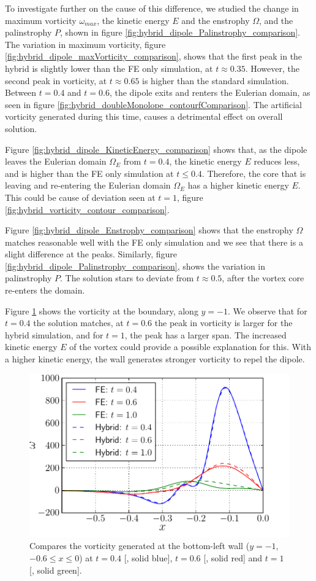 To investigate further on the cause of this difference, we studied the change in maximum vorticity $\omega_{max}$, the kinetic energy $E$ and the enstrophy $\Omega$, and the palinstrophy $P$, shown in figure \ref{fig:hybrid_dipole_Palinstrophy_comparison}. The variation in maximum vorticity, figure \ref{fig:hybrid_dipole_maxVorticity_comparison}, shows that the first peak in the hybrid is slightly lower than the FE only simulation, at $t\approx 0.35$. However, the second peak in vorticity, at $t\approx0.65$ is higher than the standard simulation. Between $t=0.4$ and $t=0.6$, the dipole exits and renters the Eulerian domain, as seen in figure \ref{fig:hybrid_doubleMonolope_contourfComparison}. The artificial vorticity generated during this time, causes a detrimental effect on overall solution. 

Figure \ref{fig:hybrid_dipole_KineticEnergy_comparison} shows that, as the dipole leaves the Eulerian domain $\Omega_E$ from $t=0.4$, the kinetic energy $E$ reduces less, and is higher than the FE only simulation at $t\leq0.4$. Therefore, the core that is leaving and re-entering the Eulerian domain $\Omega_E$ has a higher kinetic energy $E$. This could be cause of deviation seen at $t=1$, figure \ref{fig:hybrid_vorticity_contour_comparison}.

Figure \ref{fig:hybrid_dipole_Enstrophy_comparison} shows that the enstrophy $\Omega$ matches reasonable well with the FE only simulation and we see that there is a slight difference at the peaks. Similarly, figure \ref{fig:hybrid_dipole_Palinstrophy_comparison}, shows the variation in palinstrophy $P$. The solution stars to deviate from $t\approx0.5$, after the vortex core re-enters the domain.

Figure \ref{fig:hybrid_doubleMonopole_vorticityAtBoundary} shows the vorticity at the boundary, along $y=-1$. We observe that for $t=0.4$ the solution matches, at $t=0.6$ the peak in vorticity is larger for the hybrid simulation, and for $t=1$, the peak has a larger span. The increased kinetic energy $E$ of the vortex could provide a possible explanation for this. With a higher kinetic energy, the wall generates stronger vorticity to repel the dipole.

	\begin{figure}[!t]
	\centering
	\includegraphics[width=0.5\linewidth]{./figures/validation/cbColl/hybrid_doubleMonopole_vorticityAtBoundary.pdf}
	\caption{Compares the vorticity generated at the bottom-left wall ($y=-1$, $-0.6\leqslant x \leqslant 0$) at $t=0.4$ [{\color{plotBlue}{---}}, solid blue], $t=0.6$ [{\color{plotRed}{---}}, solid red] and $t=1$ [{\color{plotGreen}{---}}, solid green].}
	\label{fig:hybrid_doubleMonopole_vorticityAtBoundary}
	\end{figure}

